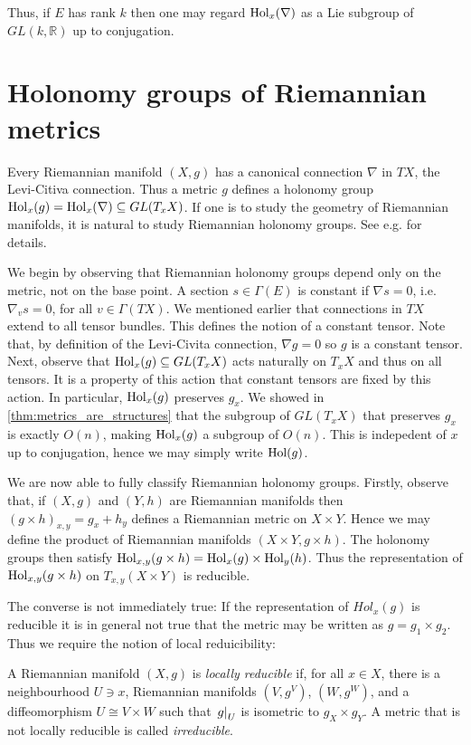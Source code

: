 \documentclass{article}
\begin{document}
Thus, if $E$ has rank $k$ then one may regard $\operatorname{Hol}_x(\nabla)$ as
a Lie subgroup of $GL(k,\mathbb{R})$ up to conjugation.

\section{Holonomy groups of Riemannian metrics}

Every Riemannian manifold $(X,g)$ has a canonical connection
$\nabla$ in $TX$, the Levi-Citiva connection. Thus a metric $g$
defines a holonomy group $\operatorname{Hol}_x(g) = \operatorname{Hol}_x(\nabla)\subseteq GL(T_x X)$.
If one is to study the geometry of Riemannian manifolds, it is natural
to study Riemannian holonomy groups. See e.g. \cite{joyce2007} for
details.

We begin by observing that Riemannian holonomy groups depend only on the
metric, not on the base point.
A section $s\in\Gamma(E)$ is constant if $\nabla s = 0$, i.e. $\nabla_v s=0$, for all $v\in\Gamma(TX)$. We mentioned earlier that connections in
$TX$ extend to all tensor bundles. This defines the notion of a constant
tensor. Note that, by definition of the Levi-Civita connection,
$\nabla g = 0$ so $g$ is a constant tensor.
Next, observe that $\operatorname{Hol}_x(g)\subseteq GL(T_x X)$ acts naturally
on $T_x X$ and thus on all tensors. It is a property of this action that
constant tensors are fixed by this action. In particular,
$\operatorname{Hol}_x(g)$ preserves $g_x$. We showed in \ref{thm:metrics_are_structures} that the subgroup of $GL(T_x X)$ that preserves $g_x$ is exactly
$O(n)$, making $\operatorname{Hol}_x(g)$ a subgroup of $O(n)$. This is indepedent of
$x$ up to conjugation, hence we may simply write $\operatorname{Hol}(g)$.

We are now able to fully classify Riemannian holonomy groups.
Firstly, observe that, if $(X,g)$ and $(Y,h)$ are Riemannian
manifolds then $(g\times h)_{x,y} = g_x + h_y$ defines a Riemannian
metric on $X\times Y$. Hence we may define
the product of Riemannian manifolds $(X\times Y,g\times h)$.
The holonomy groups then satisfy $\operatorname{Hol}_{x,y}(g\times
h)=\operatorname{Hol}_x(g)\times\operatorname{Hol}_y(h)$. Thus the representation of
$\operatorname{Hol}_{x,y}(g\times h)$ on $T_{x,y}(X\times Y)$ is reducible.

The converse is not immediately true: If the representation of
$Hol_x(g)$ is reducible it is in general not true that the metric
may be written as $g=g_1\times g_2$. Thus we require the notion of
local reduicibility:

\begin{definition}
  A Riemannian manifold $(X,g)$ is \emph{locally reducible} if, for
  all $x\in X$, there is a neighbourhood $U\ni x$, Riemannian manifolds
  $(V,g^V)$, $(W,g^W)$, and a diffeomorphism $U\cong V\times W$ such that
  $\left.{g}\right\vert_{U}$ is isometric to $g_X\times g_Y$.
  A metric that is not locally reducible is called \emph{irreducible}.
\end{definition}
\end{document}
